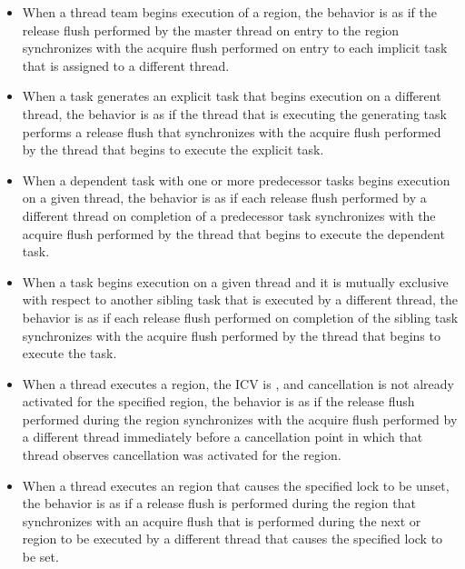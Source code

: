 \begin{itemize}
    \item When a thread team begins execution of a  region, the
        behavior is as if the release flush performed by the master thread on
        entry to the  region synchronizes with the acquire
        flush performed on entry to each implicit task that is assigned to a
        different thread.

    \item When a task generates an explicit task that begins execution on a
        different thread, the behavior is as if the thread that is executing
        the generating task performs a release flush that synchronizes with
        the acquire flush performed by the thread that begins to execute the
        explicit task.

    \item When a dependent task with one or more predecessor tasks begins
        execution on a given thread, the behavior is as if each release flush
        performed by a different thread on completion of a predecessor task
        synchronizes with the acquire flush performed by the thread that
        begins to execute the dependent task.

    \item When a task begins execution on a given thread and it is mutually
        exclusive with respect to another sibling task that is executed by a
        different thread, the behavior is as if each release flush performed
        on completion of the sibling task synchronizes with the acquire flush
        performed by the thread that begins to execute the task.

    \item When a thread executes a  region, the 
        ICV is , and cancellation is not already activated for the
        specified region, the behavior is as if the release flush performed
        during the  region synchronizes with the acquire flush
        performed by a different thread immediately before a cancellation
        point in which that thread observes cancellation was activated for the
        region.

    \item When a thread executes an  region that causes the
	specified lock to be unset, the behavior is as if a release flush is
        performed during the  region that synchronizes
        with an acquire flush that is performed during the next
         or  region to be executed by a
        different thread that causes the specified lock to be set.


\end{itemize}
